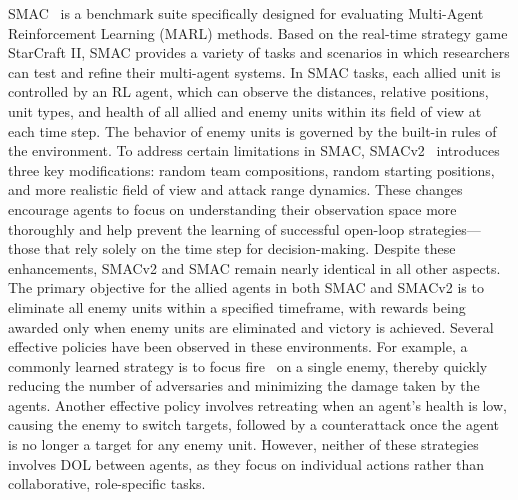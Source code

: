 SMAC~\cite{samvelyan19smac} is a benchmark suite specifically designed for evaluating Multi-Agent Reinforcement Learning (MARL) methods.
Based on the real-time strategy game StarCraft II, SMAC provides a variety of tasks and scenarios in which researchers can test and refine their multi-agent systems.
In SMAC tasks, each allied unit is controlled by an RL agent, which can observe the distances, relative positions, unit types, and health of all allied and enemy units within its field of view at each time step.
The behavior of enemy units is governed by the built-in rules of the environment.
To address certain limitations in SMAC, SMACv2~\cite{ellis2022smacv2} introduces three key modifications: random team compositions, random starting positions, and more realistic field of view and attack range dynamics.
These changes encourage agents to focus on understanding their observation space more thoroughly and help prevent the learning of successful open-loop strategies—those that rely solely on the time step for decision-making.
Despite these enhancements, SMACv2 and SMAC remain nearly identical in all other aspects.
The primary objective for the allied agents in both SMAC and SMACv2 is to eliminate all enemy units within a specified timeframe, with rewards being awarded only when enemy units are eliminated and victory is achieved.
Several effective policies have been observed in these environments.
For example, a commonly learned strategy is to focus fire~\cite{li2023ace,liu2024interaction,liu2023contrastive,mahajan2019maven,yang2022ldsa,yu2023ghq,hu2023attention,shao2022self,zang2024automatic} on a single enemy, thereby quickly reducing the number of adversaries and minimizing the damage taken by the agents.
Another effective policy involves retreating when an agent's health is low, causing the enemy to switch targets, followed by a counterattack once the agent is no longer a target for any enemy unit.
However, neither of these strategies involves DOL between agents, as they focus on individual actions rather than collaborative, role-specific tasks.


